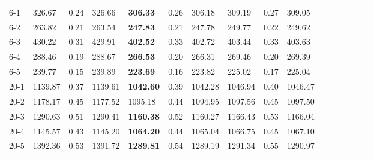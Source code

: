 \begin{table}[!htbp]
{\begin{tabular}{l *{5}{lll}}
6-1 & 326.67 & 0.24 & 326.66 & \textbf{306.33} & 0.26 & 306.18 & 309.19 & 0.27 & 309.05 &  &  &  &  &  &  \\
6-2 & 263.82 & 0.21 & 263.54 & \textbf{247.83} & 0.21 & 247.78 & 249.77 & 0.22 & 249.62 &  &  &  &  &  &  \\
6-3 & 430.22 & 0.31 & 429.91 & \textbf{402.52} & 0.33 & 402.72 & 403.44 & 0.33 & 403.63 &  &  &  &  &  &  \\
6-4 & 288.46 & 0.19 & 288.67 & \textbf{266.53} & 0.20 & 266.31 & 269.46 & 0.20 & 269.39 &  &  &  &  &  &  \\
6-5 & 239.77 & 0.15 & 239.89 & \textbf{223.69} & 0.16 & 223.82 & 225.02 & 0.17 & 225.04 &  &  &  &  &  &  \\
20-1 & 1139.87 & 0.37 & 1139.61 & \textbf{1042.60} & 0.39 & 1042.28 & 1046.94 & 0.40 & 1046.47 &  &  &  &  &  &  \\
20-2 & 1178.17 & 0.45 & 1177.52 & 1095.18 & 0.44 & 1094.95 & 1097.56 & 0.45 & 1097.50 &  &  &  &  &  &  \\
20-3 & 1290.63 & 0.51 & 1290.41 & \textbf{1160.38} & 0.52 & 1160.27 & 1166.43 & 0.53 & 1166.04 &  &  &  &  &  &  \\
20-4 & 1145.57 & 0.43 & 1145.20 & \textbf{1064.20} & 0.44 & 1065.04 & 1066.75 & 0.45 & 1067.10 &  &  &  &  &  &  \\
20-5 & 1392.36 & 0.53 & 1391.72 & \textbf{1289.81} & 0.54 & 1289.19 & 1291.34 & 0.55 & 1290.97 &  &  &  &  &  &  \\
\bottomrule
\end{tabular}
}
\end{table}
